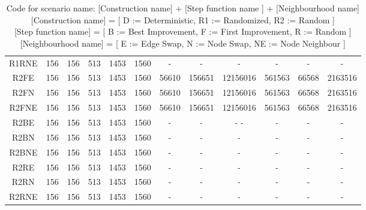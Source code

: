 \documentclass [11pt]{article}
\begin{document}
\begin{sidewaystable}
\begin{tabu} {| c |c | c |c |c |c |c |c |c |c |c |c |}
  R1RNE  & 156 & 156  & 513  & 1453 &  1560 &  - &   -  &   -  &    - &   - &   - \\ 
  R2FE  & 156 & 156  & 513  & 1453 &  1560 &  56610 & 156651  & 12156016  &  561563 & 66568 & 2163516 \\ 
  R2FN  & 156 & 156  & 513  & 1453 &  1560 &  56610 & 156651  & 12156016  &  561563 & 66568 & 2163516 \\ 
  R2FNE  & 156 & 156  & 513  & 1453 &  1560 &  56610 & 156651  & 12156016  &  561563 & 66568 & 2163516 \\ 
  R2BE  & 156 & 156  & 513  & 1453 &  1560 &  - &   -  &   -  -  &    - &   - &   - \\ 
  R2BN  & 156 & 156  & 513  & 1453 &  1560 &  - &   -  &   -  &    - &   - &   - \\ 
  R2BNE  & 156 & 156  & 513  & 1453 &  1560 &  - &   -  &   -  &    - &   - &   - \\ 
  R2RE  & 156 & 156  & 513  & 1453 &  1560 &  - &   -  &   -  &    - &   - &   - \\ 
  R2RN  & 156 & 156  & 513  & 1453 &  1560 &  - &   -  &   -  &    - &   - &   - \\ 
  R2RNE  & 156 & 156  & 513  & 1453 &  1560 &  - &   -  &   -  &    - &   - &   - \\
\end{tabu}
\caption{ Code for scenario name: [Construction name] + [Step function name ]  + [Neighbourhood name] \\ 
          {[Construction name]} = [  D := Deterministic, R1 := Randomized, R2 := Random ]  \\
          {[Step function name]} = [  B := Best Improvement, F := First Improvement, R := Random ] \\
          {[Neighbourhood name]} = [  E := Edge Swap, N := Node Swap, NE := Node Neighbour ] } 
\end{sidewaystable}
\end{document}
